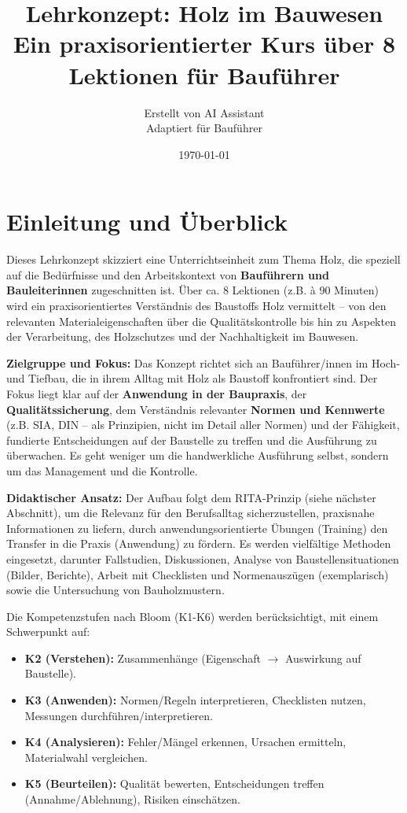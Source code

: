 \documentclass[12pt, a4paper]{article}
\title{Lehrkonzept: Holz im Bauwesen \\ Ein praxisorientierter Kurs über 8 Lektionen für Bauführer}
\author{Erstellt von AI Assistant \\ Adaptiert für Bauführer}
\date{\today}
\begin{document}
\maketitle
\thispagestyle{empty} %
\newpage

\tableofcontents
\newpage

\section{Einleitung und Überblick}

Dieses Lehrkonzept skizziert eine Unterrichtseinheit zum Thema Holz, die speziell auf die Bedürfnisse und den Arbeitskontext von \textbf{Bauführern und Bauleiterinnen} zugeschnitten ist. Über ca. 8 Lektionen (z.B. à 90 Minuten) wird ein praxisorientiertes Verständnis des Baustoffs Holz vermittelt – von den relevanten Materialeigenschaften über die Qualitätskontrolle bis hin zu Aspekten der Verarbeitung, des Holzschutzes und der Nachhaltigkeit im Bauwesen.

\textbf{Zielgruppe und Fokus:} Das Konzept richtet sich an Bauführer/innen im Hoch- und Tiefbau, die in ihrem Alltag mit Holz als Baustoff konfrontiert sind. Der Fokus liegt klar auf der \textbf{Anwendung in der Baupraxis}, der \textbf{Qualitätssicherung}, dem Verständnis relevanter \textbf{Normen und Kennwerte} (z.B. SIA, DIN – als Prinzipien, nicht im Detail aller Normen) und der Fähigkeit, fundierte Entscheidungen auf der Baustelle zu treffen und die Ausführung zu überwachen. Es geht weniger um die handwerkliche Ausführung selbst, sondern um das Management und die Kontrolle.

\textbf{Didaktischer Ansatz:} Der Aufbau folgt dem RITA-Prinzip (siehe nächster Abschnitt), um die Relevanz für den Berufsalltag sicherzustellen, praxisnahe Informationen zu liefern, durch anwendungsorientierte Übungen (Training) den Transfer in die Praxis (Anwendung) zu fördern. Es werden vielfältige Methoden eingesetzt, darunter Fallstudien, Diskussionen, Analyse von Baustellensituationen (Bilder, Berichte), Arbeit mit Checklisten und Normenauszügen (exemplarisch) sowie die Untersuchung von Bauholzmustern.

Die Kompetenzstufen nach Bloom (K1-K6) werden berücksichtigt, mit einem Schwerpunkt auf:
\begin{itemize}
    \item \textbf{K2 (Verstehen):} Zusammenhänge (Eigenschaft $\rightarrow$ Auswirkung auf Baustelle).
    \item \textbf{K3 (Anwenden):} Normen/Regeln interpretieren, Checklisten nutzen, Messungen durchführen/interpretieren.
    \item \textbf{K4 (Analysieren):} Fehler/Mängel erkennen, Ursachen ermitteln, Materialwahl vergleichen.
    \item \textbf{K5 (Beurteilen):} Qualität bewerten, Entscheidungen treffen (Annahme/Ablehnung), Risiken einschätzen.
\end{itemize}
\end{document}
